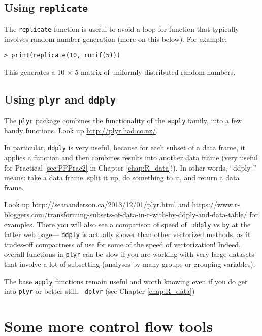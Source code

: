 \subsection{Using {\tt replicate}}

The {\tt replicate} function is useful to avoid a loop for function 
that typically involves random number generation (more on this below). 
For example:

\begin{lstlisting}
> print(replicate(10, runif(5))) 
\end{lstlisting}
This generates a 10 $\times$ 5 matrix of uniformly distributed random 
numbers. 

\subsection{Using {\tt plyr} and {\tt ddply}}

The {\tt plyr} package combines the functionality of the {\tt *apply} 
family, into a few handy functions. Look up 
\url{http://plyr.had.co.nz/}.

In particular, {\tt ddply} is very useful, because for each subset of a 
data frame, it applies a function and then combines results into 
another data frame (very useful for Practical \ref{sec:PPPrac2} in Chapter 
\ref{chap:R_data}!). In other words, ``ddply '' means: take a data frame, 
split it up, do something to it, and return a data frame.  

Look up \url{http://seananderson.ca/2013/12/01/plyr.html} and 
\url{https://www.r-bloggers.com/transforming-subsets-of-data-in-r-with-by-ddply-and-data-table/} 
for examples.	There you will also see a comparison of speed of {\tt 
ddply} vs {\tt by} at the latter web page--- {\tt ddply} is actually 
slower than other vectorized methods, as it trades-off compactness of 
use for some of the speed of vectorization! Indeed, overall functions 
in {\tt plyr} can be slow if you are working with very large datasets 
that involve a lot of subsetting (analyses by many groups or grouping 
variables). 

\begin{tipbox}
The base {\tt *apply} functions remain useful and worth 
knowing even if you do get into {\tt plyr} or better still, {\tt 
dplyr} (see Chapter \ref{chap:R_data})
\end{tipbox}

\section{Some more control flow tools}

